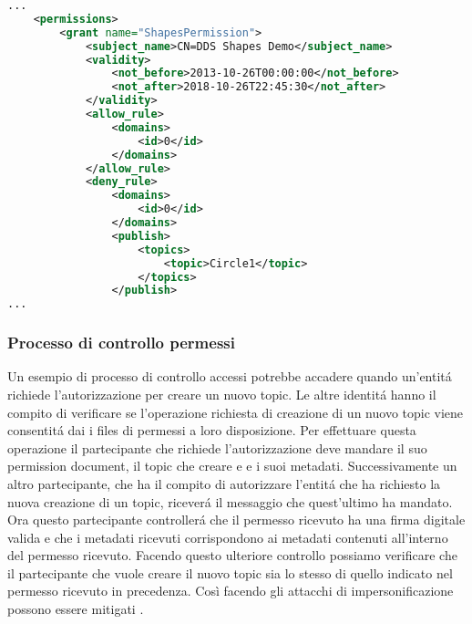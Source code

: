 \vspace{5mm} %
\begin{lstlisting}[language=XML, caption=Estratto di permissions
    document{,} tratto da documento di riferimento 
    del DDS Security vers. 1.1 \cite{ddssecurity1.1}.
    , label=XML permission file,
    captionpos=h]
...
    <permissions>
        <grant name="ShapesPermission">
            <subject_name>CN=DDS Shapes Demo</subject_name>
            <validity>
                <not_before>2013-10-26T00:00:00</not_before>
                <not_after>2018-10-26T22:45:30</not_after>
            </validity>
            <allow_rule>
                <domains>
                    <id>0</id>
                </domains>
            </allow_rule>
            <deny_rule>
                <domains>
                    <id>0</id>
                </domains>
                <publish>
                    <topics>
                        <topic>Circle1</topic>
                    </topics>
                </publish>
...
    \end{lstlisting}
\vspace{5mm}

\subsubsection{Processo di controllo permessi}
Un esempio di processo di controllo accessi potrebbe accadere
quando un'entitá richiede l'autorizzazione per creare un nuovo topic.
Le altre identitá hanno il compito di verificare se l'operazione 
richiesta di creazione di un nuovo topic viene consentitá
dai i files di permessi a loro disposizione. Per effettuare 
questa operazione il partecipante che richiede l'autorizzazione 
deve mandare il suo permission document, il topic che creare e 
e i suoi metadati. Successivamente un altro partecipante,
che ha il compito di autorizzare l'entitá che ha richiesto 
la nuova creazione di un topic, riceverá il messaggio
che quest'ultimo ha mandato. Ora questo partecipante
controllerá che il permesso 
ricevuto ha una firma digitale valida e che i metadati 
ricevuti corrispondono ai metadati contenuti all'interno 
del permesso ricevuto. Facendo questo ulteriore controllo 
possiamo verificare che il partecipante che vuole creare il 
nuovo topic sia lo stesso di quello indicato nel permesso 
ricevuto in precedenza. Così facendo gli attacchi di 
impersonificazione possono essere mitigati 
\cite{DBLP:conf/asiaccs/WangLG24}.

